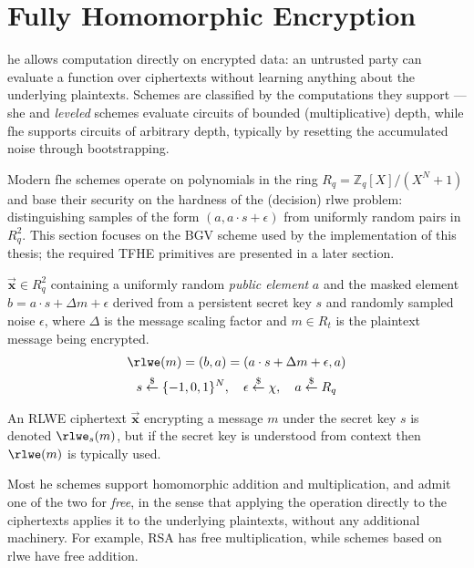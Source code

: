 \renewcommand{\vec}[1]{\overrightarrow{\mathbf{#1}}}

\section{Fully Homomorphic Encryption}
\label{sec:fhe}
\gls{he} allows computation directly on encrypted data: an untrusted party can evaluate a function over ciphertexts without learning anything about the underlying plaintexts. Schemes are classified by the computations they support --- \gls{she} and \textit{leveled} schemes evaluate circuits of bounded (multiplicative) depth, while \gls{fhe} supports circuits of arbitrary depth, typically by resetting the accumulated noise through bootstrapping.

Modern \gls{fhe} schemes operate on polynomials in the ring $R_q = \mathbb{Z}_q[X]/(X^N+1)$ and base their security on the hardness of the (decision) \gls{rlwe} problem: distinguishing samples of the form $(a, a\cdot s + \epsilon)$ from uniformly random pairs in $R_q^2$. This section focuses on the BGV scheme \cite{cryptoeprint:2011/277} used by the implementation of this thesis; the required TFHE primitives are presented in a later section.

\begin{definition} $\vec{x} \in R_q^2$ containing a uniformly random \textit{public element} $a$ and the masked element $b = a\cdot s + \Delta m + \epsilon$ derived from a persistent secret key $s$ and randomly sampled noise $\epsilon$, where $\Delta$ is the message scaling factor and $m\in R_t$ is the plaintext message being encrypted.
    \begin{gather} %
        \rlwe(m) = (b, a) = (a\cdot s + \Delta m + \epsilon, a) \\
        s \overset{\$}{\leftarrow} \{-1,0,1\}^N,\quad \epsilon \overset{\$}{\leftarrow} \chi, \quad a \overset{\$}{\leftarrow} R_q
    \end{gather}

    An RLWE ciphertext $\vec{x}$ encrypting a message $m$ under the secret key $s$ is denoted $\rlwe_s(m)$, but if the secret key is understood from context then $\rlwe(m)$ is typically used.
\end{definition}

Most \gls{he} schemes support homomorphic addition and multiplication, and admit one of the two for \textit{free}, in the sense that applying the operation directly to the ciphertexts applies it to the underlying plaintexts, without any additional machinery. For example, RSA has free multiplication, while schemes based on \gls{rlwe} have free addition.

